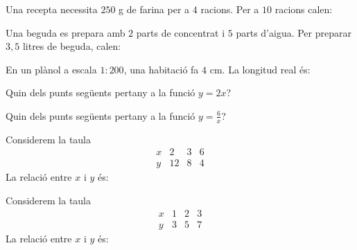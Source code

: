 \begin{enumerate}
\pregunta Una recepta necessita \(250\) g de farina per a \(4\) racions. Per a \(10\) racions calen:
\begin{enumerate}
\end{enumerate}
\feedback

\pregunta Una beguda es prepara amb \(2\) parts de concentrat i \(5\) parts d'aigua. Per preparar \(3{,}5\) litres de beguda, calen:
\begin{enumerate}
\end{enumerate}
\feedback

\pregunta En un plànol a escala \(1:200\), una habitació fa \(4\) cm. La longitud real és:
\begin{enumerate}
\end{enumerate}
\feedback

\pregunta Quin dels punts següents pertany a la funció \(y=2x\)?
\begin{enumerate}
\end{enumerate}
\feedback

\pregunta Quin dels punts següents pertany a la funció \(y=\frac{6}{x}\)?
\begin{enumerate}
\end{enumerate}
\feedback

\pregunta Considerem la taula
\[
\begin{array}{c|ccc}
x & 2 & 3 & 6 \\
\hline
y & 12 & 8 & 4
\end{array}
\]
La relació entre \(x\) i \(y\) és:
\begin{enumerate}
\end{enumerate}
\feedback

\pregunta Considerem la taula
\[
\begin{array}{c|ccc}
x & 1 & 2 & 3 \\
\hline
y & 3 & 5 & 7
\end{array}
\]
La relació entre \(x\) i \(y\) és:
\begin{enumerate}
\end{enumerate}
\feedback
\end{enumerate}
